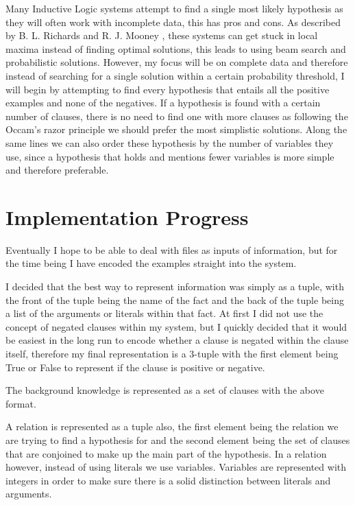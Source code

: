 \documentclass{article}
\begin{document}
Many Inductive Logic systems attempt to find a single most likely hypothesis as
they will often work with incomplete data, this has pros and cons. As described
by B. L. Richards and R. J. Mooney \cite{lrp}, these systems can get stuck in
local maxima instead of finding optimal solutions, this leads to using beam
search and probabilistic solutions. However, my focus will be on complete data
and therefore instead of searching for a single solution within a certain
probability threshold, I will begin by attempting to find every hypothesis that
entails all the positive examples and none of the negatives. If a hypothesis
is found with a certain number of clauses, there is no need to find one with
more clauses as following the Occam's razor principle we should prefer the most
simplistic solutions. Along the same lines we can also order these hypothesis
by the number of variables they use, since a hypothesis that holds and mentions
fewer variables is more simple and therefore preferable.

\section*{Implementation Progress}

Eventually I hope to be able to deal with files as inputs of information, but
for the time being I have encoded the examples straight into the system.

I decided that the best way to represent information was simply as a tuple,
  with the front of the tuple being the name of the fact and the back of the
  tuple being a list of the arguments or literals within that fact. At first I
  did not use the concept of negated clauses within my system, but I quickly
  decided that it would be easiest in the long run to encode whether a clause
  is negated within the clause itself, therefore my final representation is a
  3-tuple with the first element being True or False to represent if the clause
  is positive or negative.

The background knowledge is represented as a set of clauses with the above
format. 

A relation is represented as a tuple also, the first element being the relation
we are trying to find a hypothesis for and the second element being the set of
clauses that are conjoined to make up the main part of the hypothesis. In a
relation however, instead of using literals we use variables. Variables are
represented with integers in order to make sure there is a solid distinction
between literals and arguments.
\end{document}
